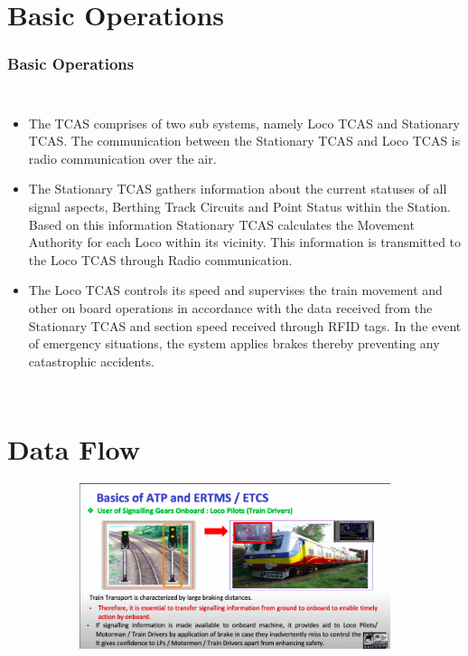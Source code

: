 \documentclass{beamer}
\begin{document}
\section{Basic Operations}
\begin{frame}
\frametitle{Basic Operations}
\begin{columns}
  \begin{itemize}
  \item The TCAS comprises of two sub systems, namely Loco TCAS and Stationary TCAS. The communication between the Stationary TCAS and Loco TCAS is radio communication over the air.
  \item The Stationary TCAS gathers information about the current statuses of all signal aspects, Berthing Track Circuits and Point Status within the Station. Based on this information Stationary TCAS calculates the Movement Authority for each Loco within its vicinity. This information is transmitted to the Loco TCAS through Radio communication.
   \item The Loco TCAS controls its speed and supervises the train movement and other on board operations in accordance with the data received from the Stationary TCAS and section speed received through RFID tags. In the event of emergency situations, the system applies brakes thereby preventing any catastrophic accidents.
   
  \end{itemize}
\end{columns}

\end{frame}

\section{Data Flow}
\begin{frame}

\begin{figure}[h!]
  \centering
  \begin{subfigure}[b]{1\linewidth}
    \includegraphics[width=\linewidth]{./figs/KAVACH3.png}
  \end{subfigure}

\end{figure}

\end{frame}
\end{document}
